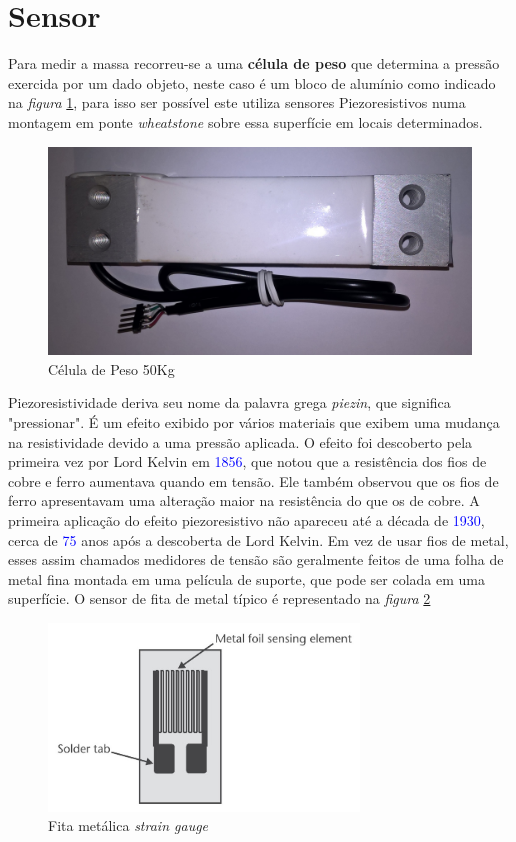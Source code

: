 \section{Sensor}
Para medir a massa recorreu-se a uma \textbf{célula de peso} que determina a pressão exercida por um dado objeto, neste caso é um bloco de alumínio como indicado na \textit{figura} \ref{Load_Cell_1}, para isso ser possível este utiliza sensores Piezoresistivos numa montagem em ponte \textit{wheatstone} sobre essa superfície em locais determinados.
\begin{figure}[H]
	\captionsetup{justification=raggedright,singlelinecheck=false}
	\flushleft
	\includegraphics[scale=0.15]{./image/PESTA/material/Load_Cell_1.jpg}
	\caption{Célula de Peso 50Kg}
	\label{Load_Cell_1}
\end{figure}
Piezoresistividade deriva seu nome da palavra grega \textit{piezin}, que significa "pressionar". É um efeito exibido por vários materiais que exibem uma mudança na resistividade devido a uma pressão aplicada. O efeito foi descoberto pela primeira vez por Lord Kelvin em \textcolor{blue}{1856}, que notou que a resistência dos fios de cobre e ferro aumentava quando em tensão. Ele também observou que os fios de ferro apresentavam uma alteração maior na resistência do que os de cobre. A primeira aplicação do efeito piezoresistivo não apareceu até a década de \textcolor{blue}{1930}, cerca de \textcolor{blue}{75} anos após a descoberta de Lord Kelvin. Em vez de usar fios de metal, esses assim chamados medidores de tensão são geralmente feitos de uma folha de metal fina montada em uma película de suporte, que pode ser colada em uma superfície. O sensor de fita de metal típico é representado na \textit{figura} \ref{strain_gauge_1} \cite{book-9}
\begin{figure}[H]
	\centering
	\includegraphics[height=5cm]{./image/PESTA/general/strain_gauge_1.jpg}
	\caption{Fita metálica \textit{strain gauge} \cite{book-9}}
	\label{strain_gauge_1}
\end{figure}
